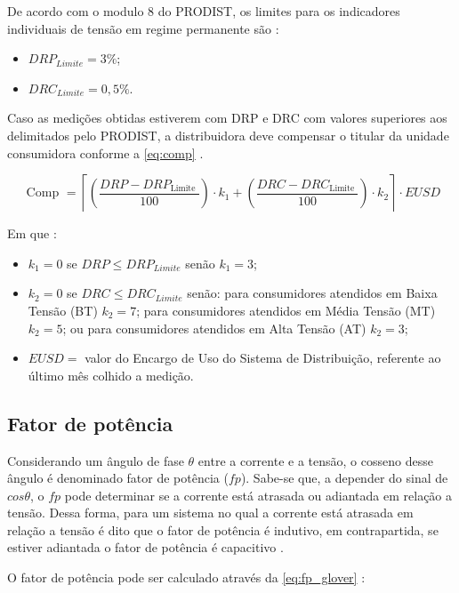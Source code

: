 De acordo com o modulo 8 do PRODIST, os limites para os indicadores individuais de tensão em regime permanente são \cite{ref:ANEEL2021}:

\begin{itemize}
  \item $DRP_{Limite}=3\%$;
  \item $DRC_{Limite}=0,5\%$.
\end{itemize}

Caso as medições obtidas estiverem com DRP e DRC com valores superiores aos delimitados pelo PRODIST, a distribuidora deve compensar o titular da unidade consumidora conforme a \autoref{eq:comp} \cite{ref:ANEEL2021}.

\begin{equation}
  \text { Comp }=\left\lceil\left(\frac{DRP - DRP_{\text {Limite }}}{100}\right) \cdot k_1+\left(\frac{D R C-D R C_{\text {Limite }}}{100}\right) \cdot k_2\right\rceil \cdot EUSD
  \label{eq:comp}
\end{equation}

Em que \cite{ref:ANEEL2021}:

\begin{itemize}
  \item $k_1=0$ se $DRP \leq DRP_{Limite}$ senão $k_1=3$;
  \item $k_2=0$ se $DRC \leq DRC_{Limite}$ senão: para consumidores atendidos em Baixa Tensão (BT) $k_2=7$; para consumidores atendidos em Média Tensão (MT) $k_2=5$; ou para consumidores atendidos em Alta Tensão (AT) $k_2=3$;
  \item $EUSD =$ valor do Encargo de Uso do Sistema de Distribuição, referente ao último mês colhido a medição.
\end{itemize}

\subsection{Fator de potência}

Considerando um ângulo de fase $\theta$ entre a corrente e a tensão, o cosseno desse ângulo é denominado fator de potência ($fp$). Sabe-se que, a depender do sinal de $cos\theta$, o $fp$ pode determinar se a corrente está atrasada ou adiantada em relação a tensão. Dessa forma, para um sistema no qual a corrente está atrasada em relação a tensão é dito que o fator de potência é indutivo, em contrapartida, se estiver adiantada o fator de potência é capacitivo \cite{ref:glover_2017}.

O fator de potência pode ser calculado através da \autoref{eq:fp_glover} \cite{ref:glover_2017}:

